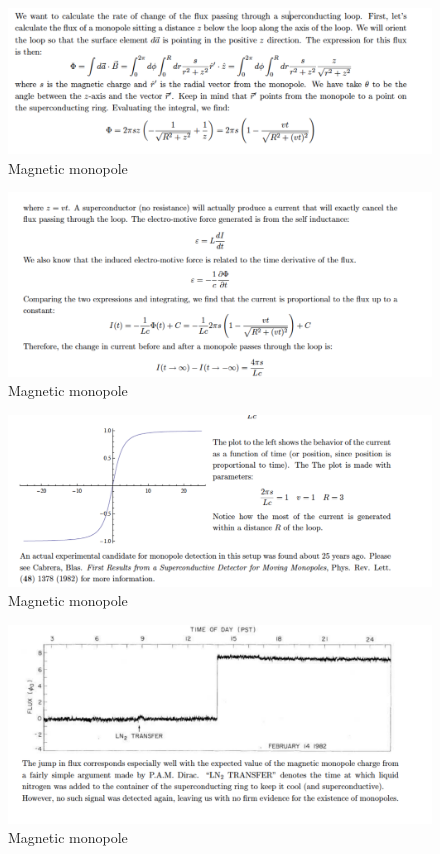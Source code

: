 \documentclass[makesolutionspdf]{esg8022pset}
\begin{document}
\begin{solution}

 \begin{figure}[H]
    \centering
    \includegraphics[width = 15cm]{mono_sol_a}
    \caption{Magnetic monopole}
\end{figure}

 \begin{figure}[H]
    \centering
    \includegraphics[width = 15cm]{mono_sol_b}
    \caption{Magnetic monopole}
\end{figure}

 \begin{figure}[H]
    \centering
    \includegraphics[width = 15cm]{monopole_sol_c}
    \caption{Magnetic monopole}
   \end{figure} 
    
     \begin{figure}[H]
    \centering
    \includegraphics[width = 15cm]{monopole_sol_d}
    \caption{Magnetic monopole}
\end{figure}

\end{solution}
\end{document}
